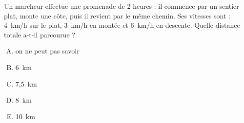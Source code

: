 Un marcheur effectue une promenade de 2 heures : il commence par un
sentier plat, monte une côte, puis il revient par le même chemin. Ses
vitesses sont : 4~km/h sur le plat, 3~km/h en montée et 6~km/h en
descente. Quelle distance totale a-t-il parcourue ?
\begin{multicols}{3}
  \begin{enumerate}[A)]
  \item on ne peut pas savoir
  \item 6~km
  \item 7,5~km
  \item 8~km
  \item 10~km
  \end{enumerate}
\end{multicols}